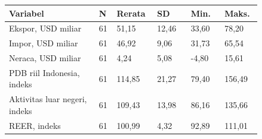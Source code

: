 {\small\setlength{\tabcolsep}{3pt}\renewcommand{\arraystretch}{1.15}
\begin{tabular}{p{0.32\linewidth}p{0.045\linewidth}p{0.12\linewidth}p{0.12\linewidth}p{0.12\linewidth}p{0.12\linewidth}}
\toprule
\textbf{Variabel} & \textbf{N} & \textbf{Rerata} & \textbf{SD} & \textbf{Min.} & \textbf{Maks.}\\
\midrule
Ekspor, USD miliar & 61 & 51,15 & 12,46 & 33,60 & 78,20\\
Impor, USD miliar & 61 & 46,92 & 9,06 & 31,73 & 65,54\\
Neraca, USD miliar & 61 & 4,24 & 5,08 & -4,80 & 15,61\\
PDB riil Indonesia, indeks & 61 & 114,85 & 21,27 & 79,40 & 156,49\\
Aktivitas luar negeri, indeks & 61 & 109,43 & 13,98 & 86,16 & 135,66\\
REER, indeks & 61 & 100,99 & 4,32 & 92,89 & 111,01\\
\bottomrule
\end{tabular}
}
